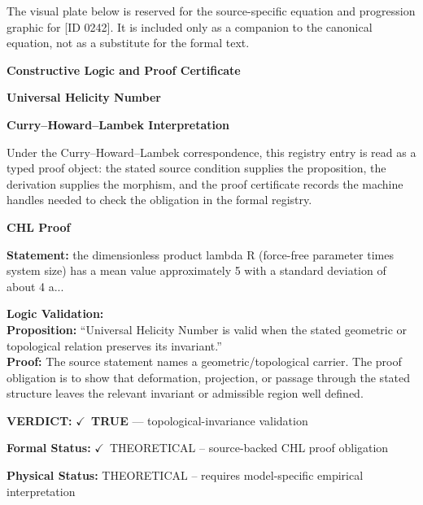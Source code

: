 \begingroup\footnotesize\sloppy
The visual plate below is reserved for the source-specific equation and progression graphic for [ID 0242]. It is included only as a companion to the canonical equation, not as a substitute for the formal text.
\par\endgroup
\ifTZPDarkEdition
{}
\fi

\clearpage
\begingroup\tzpsupportsetup
\noindent\textbf{\fontsize{10.8pt}{12.8pt}\selectfont [ID 0242] Constructive Logic and Proof Certificate}\par
\noindent\textbf{\fontsize{10pt}{12pt}\selectfont Universal Helicity Number}\par
\vspace{0.45em}
\begingroup
\footnotesize
\setlength{\parskip}{0.22em}
\setlength{\parindent}{0pt}
\noindent\textbf{Curry--Howard--Lambek Interpretation}\par
Under the Curry--Howard--Lambek correspondence, this registry entry is read as a typed proof
object: the stated source condition supplies the proposition, the derivation supplies the
morphism, and the proof certificate records the machine handles needed to check the obligation
in the formal registry.

\vspace{0.45em}
\noindent\textbf{CHL Proof}\par
\textbf{Statement:} the dimensionless product lambda R (force-free parameter times system size) has a mean
value approximately 5 with a standard deviation of about 4 a...

\textbf{Logic Validation:}\\
\textbf{Proposition:} ``Universal Helicity Number is valid when the stated geometric or topological relation
preserves its invariant.''\\
\textbf{Proof:} The source statement names a geometric/topological carrier. The proof obligation is to
show that deformation, projection, or passage through the stated structure leaves the
relevant invariant or admissible region well defined.

\textbf{VERDICT:} \ensuremath{\checkmark}\ \textbf{TRUE} --- topological-invariance validation

\textbf{Formal Status:} \ensuremath{\checkmark}\ THEORETICAL -- source-backed CHL proof obligation

\textbf{Physical Status:} THEORETICAL -- requires model-specific empirical interpretation
\par\vspace{0.45em}
\par
\ifTZPDarkEdition
{}
\fi
\endgroup
\endgroup
